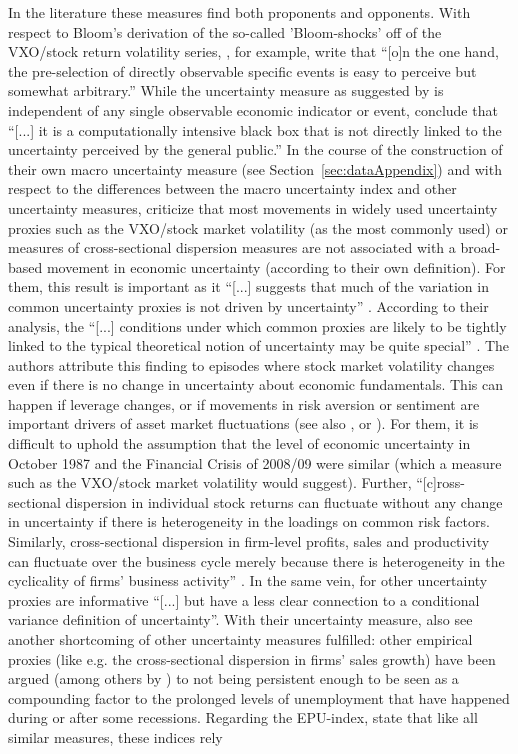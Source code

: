 \documentclass[a4paper,11pt,listof=nochaptergap,oneside,pointednumbers,bibtotoc,bigheadings,liststotoc]{scrbook}
\theoremstyle{mysatz}
\theoremstyle{mydefinition}
\theoremstyle{mytheorem}
\theoremstyle{mybemerkung}
\begin{document}
In the literature these measures find both proponents and opponents. With respect to Bloom's derivation of the so-called 'Bloom-shocks' off of the VXO/stock return volatility series, \citet[p. 3]{bontempietal:16}, for example, write that  ``[o]n the one hand, the pre-selection of directly observable specific events is easy to perceive but somewhat arbitrary.'' While the uncertainty measure as suggested by \citet{juradoetal:15} is independent of any single observable economic indicator or event, \citet[p. 13]{bontempietal:16} conclude that ``[...] it is a computationally intensive black box that is not directly linked to the uncertainty perceived by the general public.'' In the course of the construction of their own macro uncertainty measure (see Section~\ref{sec:dataAppendix}) and with respect to the differences between the macro uncertainty index and other uncertainty measures, \citet{juradoetal:15} criticize that most movements in widely used uncertainty proxies such as the VXO/stock market volatility (as the most commonly used) or measures of cross-sectional dispersion measures are not associated with a broad-based movement in economic uncertainty (according to their own definition). For them, this result is important as it ``[...] suggests that much of the variation in common uncertainty proxies is not driven by uncertainty'' \citep[p. 1180]{juradoetal:15}. According to their analysis, the ``[...] conditions under which common proxies are likely to be tightly linked to the typical theoretical notion of uncertainty may be quite special'' \citep[p. 1178]{juradoetal:15}. The authors attribute this finding to episodes where stock market volatility changes even if there is no change in uncertainty about economic fundamentals. This can happen if leverage changes, or if movements in risk aversion or sentiment are important drivers of asset market fluctuations (see also \citet{bekaertetal:13}, \citet{moore:17} or \citet{IMF:17}). For them, it is difficult to uphold the assumption that the level of economic uncertainty in October 1987 and the Financial Crisis of 2008/09 were similar (which a measure such as the VXO/stock market volatility would suggest). Further, ``[c]ross-sectional dispersion in individual stock returns can fluctuate without any change in uncertainty if there is heterogeneity in the loadings on common risk factors. Similarly, cross-sectional dispersion in firm-level profits, sales and productivity can fluctuate over the business cycle merely because there is heterogeneity in the cyclicality of firms' business activity'' \citep[p. 1178]{juradoetal:15}. In the same vein, for  \citet[p. 30]{orlikandveldkamp:14} other uncertainty proxies are informative ``[...] but have a less clear connection to a conditional variance definition of uncertainty''. With their uncertainty measure, \citet{juradoetal:15} also see another shortcoming of other uncertainty measures fulfilled: other empirical proxies (like e.g. the cross-sectional dispersion in firms' sales growth) have been argued (among others by \citet{schaal:11}) to not being persistent enough to be seen as a compounding factor to the prolonged levels of unemployment that have happened during or after some recessions. Regarding the EPU-index, \citet{IMF:17} state that like all similar measures, these indices rely 
\end{document}
